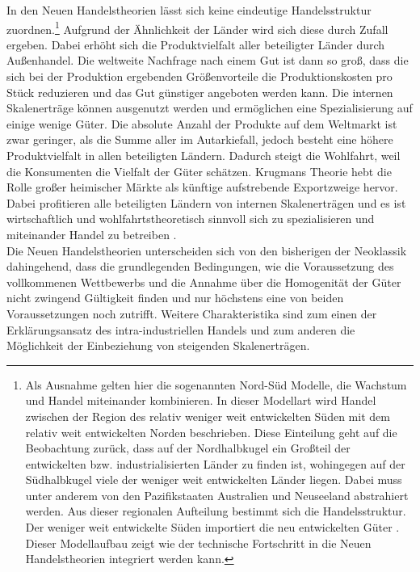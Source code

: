  In den Neuen Handelstheorien lässt sich keine eindeutige Handelsstruktur zuordnen.\footnote{Als Ausnahme gelten hier die sogenannten Nord-Süd Modelle, die Wachstum und Handel miteinander kombinieren. In dieser Modellart wird Handel zwischen der Region des relativ weniger weit entwickelten Süden mit dem relativ weit entwickelten Norden beschrieben. Diese Einteilung geht auf die Beobachtung zurück, dass auf der Nordhalbkugel ein Großteil der entwickelten bzw. industrialisierten Länder zu finden ist, wohingegen auf der Südhalbkugel viele der weniger weit entwickelten Länder liegen. Dabei muss unter anderem von den Pazifikstaaten Australien und Neuseeland abstrahiert werden. Aus dieser regionalen Aufteilung bestimmt sich die Handelsstruktur.  Der weniger weit entwickelte Süden importiert die neu entwickelten Güter \cite{Grossman.1991a,Krugman.1990}.
Dieser Modellaufbau zeigt wie der technische Fortschritt in die Neuen Handelstheorien integriert werden kann. 
 } Aufgrund der Ähnlichkeit der Länder wird sich diese durch Zufall ergeben. Dabei erhöht sich die Produktvielfalt aller beteiligter Länder durch Außenhandel. Die weltweite Nachfrage nach einem Gut ist dann so groß, dass die sich bei der Produktion ergebenden Größenvorteile die Produktionskosten pro Stück reduzieren und das Gut günstiger angeboten werden kann. Die internen Skalenerträge können ausgenutzt werden und ermöglichen eine Spezialisierung auf einige wenige Güter. Die absolute Anzahl der Produkte auf dem Weltmarkt ist zwar geringer, als die Summe aller im Autarkiefall, jedoch besteht eine höhere Produktvielfalt in allen beteiligten Ländern. Dadurch steigt die Wohlfahrt, weil die Konsumenten die Vielfalt der Güter schätzen. Krugmans Theorie hebt die Rolle großer heimischer Märkte als künftige aufstrebende Exportzweige hervor. Dabei profitieren alle beteiligten Ländern von internen Skalenerträgen und es ist wirtschaftlich und wohlfahrtstheoretisch sinnvoll sich zu spezialisieren und miteinander Handel zu betreiben \cite{Krugman.79,Krugman.1983,Melvin.1969}.\\
%
Die Neuen Handelstheorien unterscheiden sich von den bisherigen der Neoklassik dahingehend, dass die grundlegenden Bedingungen, wie die Voraussetzung des vollkommenen Wettbewerbs und die Annahme über die Homogenität der Güter nicht zwingend Gültigkeit finden und nur höchstens eine von beiden Voraussetzungen noch zutrifft. Weitere Charakteristika sind zum einen der Erklärungsansatz des intra-industriellen Handels und zum anderen die Möglichkeit der Einbeziehung von steigenden Skalenerträgen. \\
